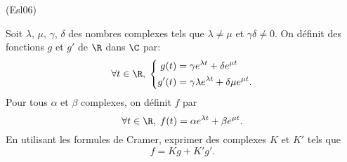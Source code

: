 \begin{tiny}(Esl06)\end{tiny} Soit $\lambda$, $\mu$, $\gamma$, $\delta$ des nombres complexes tels que $\lambda \neq \mu$ et $\gamma \delta \neq 0$. On définit des fonctions $g$ et $g'$ de $\R$ dans $\C$ par:
\[
 \forall t \in \R, \;
 \left\lbrace 
 \begin{aligned}
  g(t) &= \gamma e^{\lambda t} + \delta e^{\mu t} \\ g'(t) &= \gamma \lambda e^{\lambda t} + \delta \mu e^{\mu t}.
 \end{aligned}
 \right. 
\]
Pour tous $\alpha$ et $\beta$ complexes, on définit $f$ par
\[
 \forall t \in \R, \; f(t) = \alpha e^{\lambda t} + \beta e^{\mu t}.
\]
En utilisant les formules de Cramer, exprimer des complexes $K$ et $K'$ tels que 
\[
 f = Kg + K'g'.
\]
